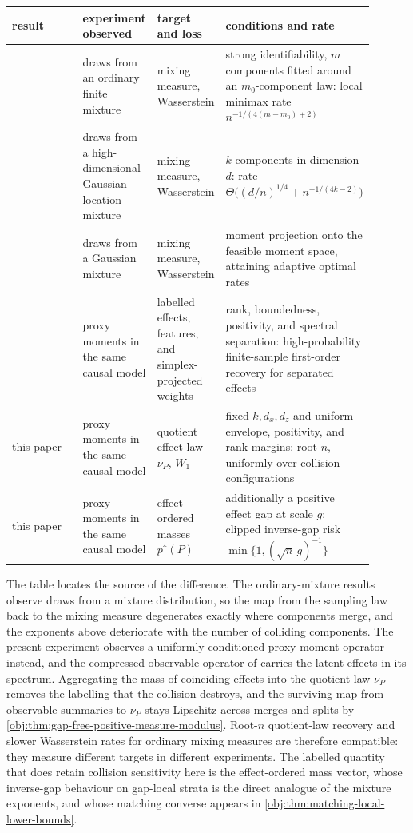 \begin{center}
\small
\begin{tabular}{p{0.20\linewidth}p{0.17\linewidth}p{0.17\linewidth}p{0.36\linewidth}}
result & experiment observed & target and loss & conditions and rate\\
\hline
\citet{HeinrichKahn2018} & draws from an ordinary finite mixture & mixing measure, Wasserstein & strong identifiability, \(m\) components fitted around an \(m_0\)-component law: local minimax rate \(n^{-1/(4(m-m_0)+2)}\)\\
\citet{DossWuYangZhou2023} & draws from a high-dimensional Gaussian location mixture & mixing measure, Wasserstein & \(k\) components in dimension \(d\): rate \(\Theta\bigl((d/n)^{1/4}+n^{-1/(4k-2)}\bigr)\)\\
\citet{WuYang2020} & draws from a Gaussian mixture & mixing measure, Wasserstein & moment projection onto the feasible moment space, attaining adaptive optimal rates\\
\citet{VirkMazaheriWu2026} & proxy moments in the same causal model & labelled effects, features, and simplex-projected weights & rank, boundedness, positivity, and spectral separation: high-probability finite-sample first-order recovery for separated effects\\
this paper & proxy moments in the same causal model & quotient effect law \(\nu_P\), \(W_1\) & fixed \(k,d_x,d_z\) and uniform envelope, positivity, and rank margins: root-\(n\), uniformly over collision configurations\\
this paper & proxy moments in the same causal model & effect-ordered masses \(p^\uparrow(P)\) & additionally a positive effect gap at scale \(g\): clipped inverse-gap risk \(\min\{1,(\sqrt n\,g)^{-1}\}\)\\
\end{tabular}
\end{center}

The table locates the source of the difference. The ordinary-mixture results observe draws from a mixture distribution, so the map from the sampling law back to the mixing measure degenerates exactly where components merge, and the exponents above deteriorate with the number of colliding components. The present experiment observes a uniformly conditioned proxy-moment operator instead, and the compressed observable operator of \citet{VirkMazaheriWu2026} carries the latent effects in its spectrum. Aggregating the mass of coinciding effects into the quotient law \(\nu_P\) removes the labelling that the collision destroys, and the surviving map from observable summaries to \(\nu_P\) stays Lipschitz across merges and splits by \cref{obj:thm:gap-free-positive-measure-modulus}. Root-\(n\) quotient-law recovery and slower Wasserstein rates for ordinary mixing measures are therefore compatible: they measure different targets in different experiments. The labelled quantity that does retain collision sensitivity here is the effect-ordered mass vector, whose inverse-gap behaviour on gap-local strata is the direct analogue of the mixture exponents, and whose matching converse appears in \cref{obj:thm:matching-local-lower-bounds}.

